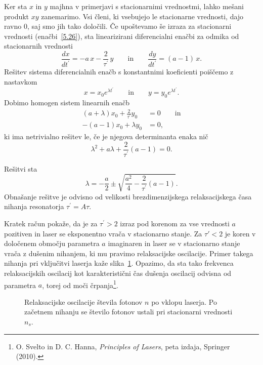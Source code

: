 Ker sta $x$ in $y$ majhna v primerjavi s stacionarnimi vrednostmi, lahko
mešani produkt $xy$ zanemarimo. Vsi členi, ki vsebujejo le stacionarne vrednosti,
dajo ravno 0, saj smo jih tako določili. Če upoštevamo še izraza 
za stacionarni vrednosti (enačbi~\ref{5.26}), 
sta linearizirani diferencialni enačbi za odmika od stacionarnih vrednosti 
\begin{equation}
\frac{dx}{dt^{\prime }} =-a\,x-\frac{2}{\tau ^{\prime }}\,y   \qquad \mathrm{in} \qquad
\frac{dy}{dt^{\prime }} =(a-1)\,x.
\label{5.28}
\end{equation}
Rešitev sistema diferencialnih enačb s konstantnimi
koeficienti poiščemo z nastavkom
\begin{equation}
x=x_{0}e^{\lambda t^{\prime }} \qquad \mathrm{in} \qquad 
y=y_{0}e^{\lambda t^{\prime }}.
\label{5.29}
\end{equation}
Dobimo homogen sistem linearnih enačb 
\begin{align}
(a+\lambda )x_{0}+\frac{2}{\tau ^{\prime }}y_{0} &=0  \label{5.30} \qquad \mathrm{in}\\
-(a-1)x_{0}+\lambda y_{0} &=0,
\end{align}
ki ima netrivialno rešitev le, če je njegova determinanta enaka nič
\begin{equation}
\lambda ^{2}+a\lambda +\frac{2}{\tau ^{\prime }}(a-1)=0.  
\label{5.301}
\end{equation}

Rešitvi sta 
\begin{equation}
\lambda =-\frac{a}{2}\pm \sqrt{\frac{a^{2}}{4}-\frac{2}{\tau ^{\prime }}(a-1)}.
\label{5.31}
\end{equation}
Obnašanje rešitve je odvisno od velikosti brezdimenzijskega relaksacijskega
časa nihanja resonatorja $\tau ^{\prime }=A\tau $. 

Kratek račun pokaže, da je 
za $\tau ^{\prime }>2$ izraz pod korenom za vse vrednosti $a$ pozitiven in laser 
se eksponentno vrača v stacionarno stanje. Za $\tau' <2$ je koren v določenem območju
parametra $a$ imaginaren in laser se v stacionarno stanje vrača z
dušenim nihanjem, ki mu pravimo relaksacijske 
oscilacije.
Primer takega nihanja 
pri vključitvi laserja kaže slika~\ref{fig:relax}. Opazimo, da sta tako 
frekvenca relaksacijskih oscilacij kot karakteristični čas dušenja oscilacij
odvisna od parametra $a$, torej od moči črpanja\footnote{O. Svelto in D. C. Hanna, 
{\it Principles of Lasers}, peta izdaja, 
Springer (2010).}.
\begin{figure}[ht]
\centering
\def\svgwidth{80truemm} 

\caption{Relaksacijske oscilacije števila fotonov $n$ po vklopu laserja. Po začetnem
nihanju se število fotonov ustali pri stacionarni vrednosti $n_s$.}
\label{fig:relax}
\end{figure}

